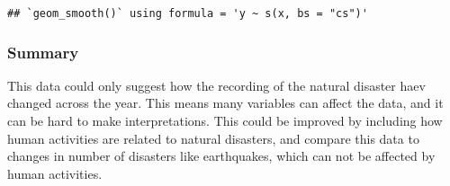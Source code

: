 \documentclass[
]{article}
\begin{document}
\begin{verbatim}
## `geom_smooth()` using formula = 'y ~ s(x, bs = "cs")'
\end{verbatim}

\hypertarget{summary}{%
\subsubsection{Summary}\label{summary}}

This data could only suggest how the recording of the natural disaster
haev changed across the year. This means many variables can affect the
data, and it can be hard to make interpretations. This could be improved
by including how human activities are related to natural disasters, and
compare this data to changes in number of disasters like earthquakes,
which can not be affected by human activities.
\end{document}

